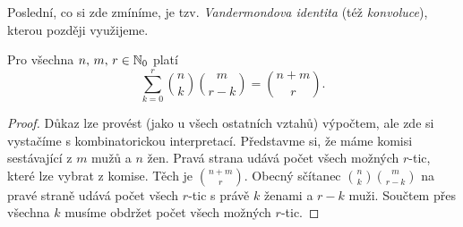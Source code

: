 Poslední, co si zde zmíníme, je tzv. \emph{Vandermondova identita} (též \emph{konvoluce}), kterou později využijeme.
\begin{theorem}\label{thm:vandermondova_identita}
    Pro všechna $n,\,m,\,r\in\mathbb{N}_0$ platí
    \[\sum_{k=0}^{r}\binom{n}{k}\binom{m}{r-k}=\binom{n+m}{r}.\]
\end{theorem}
\begin{proof}
    Důkaz lze provést (jako u všech ostatních vztahů) výpočtem, ale zde si vystačíme s kombinatorickou interpretací. Představme si, že máme komisi sestávající z $m$ mužů a $n$ žen. Pravá strana udává počet všech možných $r$-tic, které lze vybrat z komise. Těch je $\binom{n+m}{r}$. Obecný sčítanec $\binom{n}{k}\binom{m}{r-k}$ na pravé straně udává počet všech $r$-tic s právě $k$ ženami a $r-k$ muži. Součtem přes všechna $k$ musíme obdržet počet všech možných $r$-tic.
\end{proof}